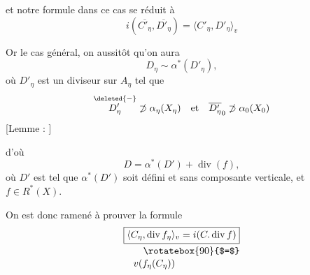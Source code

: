 et notre formule dans ce cas se réduit à
\[
\boxed{i(\overline{C'_{\eta}},\overline{D'_{\eta}})=
 \langle C'_{\eta},D'_{\eta}\rangle_v}
\]

Or  le cas général, on  aussitôt qu'on aura
\[
D_{\eta}\sim\alpha^*(D'_{\eta}),
\]
où $D'_{\eta}$ est un diviseur sur $A_{\eta}$ tel que
\[
{\overset{\deleted{-}}{D'_{\eta}}}\not\supset\alpha_{\eta}(X_{\eta})
\quad\text{et}\quad
{\overline{D'_{\eta}}}_0\not\supset\alpha_0(X_0)
\]
[Lemme : ]

d'où
\[
D=\alpha^*(D')+\operatorname{div}(f),
\]
où $D'$ est tel que $\alpha^*(D')$ soit défini et sans composante verticale, et $f\in R^*(X)$. 

On est donc ramené à prouver la formule
\[
\begin{aligned}
&\boxed{\langle C_{\eta},\operatorname{div}f_{\eta}\rangle_v=i(C.\operatorname{div}f)}\\[-2pt]
&\qquad\rotatebox{90}{$=$}\\[-2pt]
&\quad v(f_{\eta}(C_{\eta}))
\end{aligned}
\]
